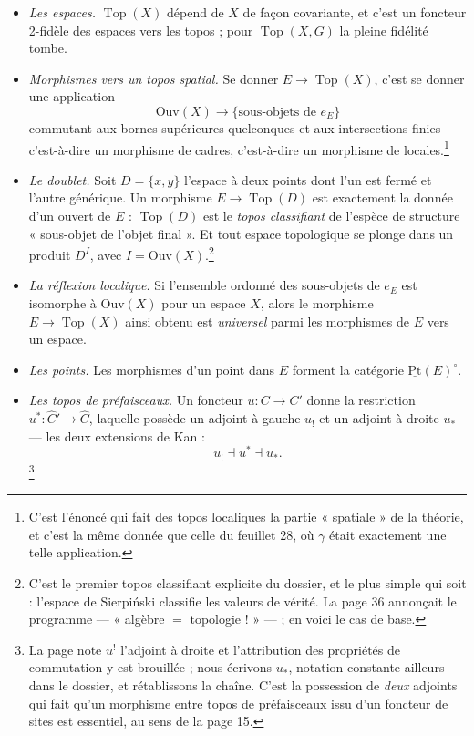 \documentclass[11pt,a4paper]{article}
\begin{document}
\begin{itemize}
\item \emph{Les espaces.} $\operatorname{Top}(X)$ dépend de $X$ de façon
covariante, et c'est un foncteur 2-fidèle des espaces vers les topos ; pour
$\operatorname{Top}(X,G)$ la pleine fidélité tombe.

\item \emph{Morphismes vers un topos spatial.} Se donner $E \to
\operatorname{Top}(X)$, c'est se donner une application
\[
\mathrm{Ouv}(X) \longrightarrow \{\text{sous-objets de } e_{E}\}
\]
commutant aux bornes supérieures quelconques et aux intersections finies —
c'est-à-dire un morphisme de cadres, c'est-à-dire un morphisme de
locales.\footnote{C'est l'énoncé qui fait des topos localiques la partie
« spatiale » de la théorie, et c'est la même donnée que celle du feuillet 28,
où $\gamma$ était exactement une telle application.}

\item \emph{Le doublet.} Soit $D = \{x,y\}$ l'espace à deux points dont l'un est
fermé et l'autre générique. Un morphisme $E \to \operatorname{Top}(D)$ est
exactement la donnée d'un ouvert de $E$ : $\operatorname{Top}(D)$ est le
\emph{topos classifiant} de l'espèce de structure « sous-objet de l'objet
final ». Et tout espace topologique se plonge dans un produit $D^{I}$, avec
$I = \mathrm{Ouv}(X)$.\footnote{C'est le premier topos classifiant explicite du
dossier, et le plus simple qui soit : l'espace de Sierpiński classifie les
valeurs de vérité. La page 36 annonçait le programme — « algèbre $=$
topologie ! » — ; en voici le cas de base.}

\item \emph{La réflexion localique.} Si l'ensemble ordonné des sous-objets de
$e_{E}$ est isomorphe à $\mathrm{Ouv}(X)$ pour un espace $X$, alors le
morphisme $E \to \operatorname{Top}(X)$ ainsi obtenu est \emph{universel} parmi
les morphismes de $E$ vers un espace.

\item \emph{Les points.} Les morphismes d'un point dans $E$ forment la
catégorie $\underline{\mathrm{Pt}}(E)^{\circ}$.

\item \emph{Les topos de préfaisceaux.} Un foncteur $u : C \to C'$ donne la
restriction $u^{*} : \widehat{C}' \to \widehat{C}$, laquelle possède un adjoint
à gauche $u_{!}$ et un adjoint à droite $u_{*}$ — les deux extensions de
Kan :
\[
u_{!} \dashv u^{*} \dashv u_{*}.
\]
\footnote{La page note $u^{!}$ l'adjoint à droite et l'attribution des
propriétés de commutation y est brouillée ; nous écrivons $u_{*}$, notation
constante ailleurs dans le dossier, et rétablissons la chaîne. C'est la
possession de \emph{deux} adjoints qui fait qu'un morphisme entre topos de
préfaisceaux issu d'un foncteur de sites est essentiel, au sens de la page 15.}


\end{itemize}
\end{document}
